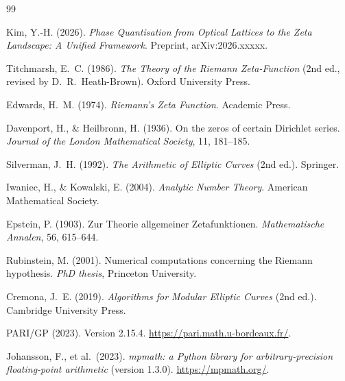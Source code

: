 \documentclass[11pt, a4paper]{article}
\theoremstyle{plain}
\theoremstyle{definition}
\begin{document}
\begin{thebibliography}{99}

Kim, Y.-H. (2026).
\textit{Phase Quantisation from Optical Lattices to the Zeta Landscape:
A Unified Framework}.
Preprint, arXiv:2026.xxxxx.

Titchmarsh, E.~C. (1986).
\textit{The Theory of the Riemann Zeta-Function} (2nd ed., revised by
D.~R.~Heath-Brown).
Oxford University Press.

Edwards, H.~M. (1974).
\textit{Riemann's Zeta Function}.
Academic Press.

Davenport, H., \& Heilbronn, H. (1936).
On the zeros of certain Dirichlet series.
\textit{Journal of the London Mathematical Society}, 11, 181--185.

Silverman, J.~H. (1992).
\textit{The Arithmetic of Elliptic Curves} (2nd ed.).
Springer.

Iwaniec, H., \& Kowalski, E. (2004).
\textit{Analytic Number Theory}.
American Mathematical Society.

Epstein, P. (1903).
Zur Theorie allgemeiner Zetafunktionen.
\textit{Mathematische Annalen}, 56, 615--644.

Rubinstein, M. (2001).
Numerical computations concerning the Riemann hypothesis.
\textit{PhD thesis}, Princeton University.

Cremona, J.~E. (2019).
\textit{Algorithms for Modular Elliptic Curves} (2nd ed.).
Cambridge University Press.

PARI/GP (2023). Version 2.15.4.
\url{https://pari.math.u-bordeaux.fr/}.

Johansson, F., et al.\ (2023).
\textit{mpmath: a Python library for arbitrary-precision
floating-point arithmetic} (version 1.3.0).
\url{https://mpmath.org/}.

\end{thebibliography}
\end{document}
